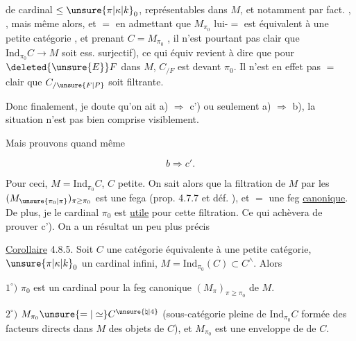 de cardinal $\leq\unsure{\pi|\kappa|k}_0$, représentables dans $M$, et notamment par fact. , , mais même alors, et $=$ en admettant que $M_{\pi_0}$ lui-$=$\unsure{!} est équivalent à une petite catégorie\deleted{\unsure{)}} , et prenant $C=M_{\pi_0}$\deleted{\unsure{)}} , il n'est pourtant pas clair que   $\mathrm{Ind}_{\pi_0} C\longrightarrow M$ soit ess. surjectif), ce qui équiv revient à dire que pour  $\deleted{\unsure{E}}F$ dans $M$, $C_{/F}$ est  devant $\pi_0$. Il n'est en effet pas $=$ clair que $C_{/\unsure{F|P}}$ soit filtrante.

Donc finalement, je doute qu'on ait a) $\Longrightarrow$ c') ou seulement a) $\Longrightarrow$ b), la situation n'est pas bien comprise visiblement.

Mais prouvons quand même

\[ b\Longrightarrow c'. \]

Pour ceci,   $M=\mathrm{Ind}_{\pi_0}C$, $C$ petite. On sait alors que la filtration de $M$ par les $(M_{\unsure{\pi_0|\pi}})_{\pi\geq\pi_0}$ est une  fega (prop. 4.7.7 et déf. ), et $=$ une feg \uline{canonique}. De plus, je  le cardinal $\pi_0$ est \uline{utile}  pour cette filtration. Ce qui achèvera de prouver c').  On a un résultat un peu plus précis\unsure{:}

\uline{Corollaire} 4.8.5. Soit $C$ une  catégorie équivalente à une petite catégorie,  $\unsure{\pi|\kappa|k}_0$ un cardinal infini, $M=\mathrm{Ind}_{\pi_0}(C)\subset C^{\wedge}$. Alors

$1^\circ)$ $\pi_0$ est un cardinal  pour la  feg canonique $(M_\pi)_{\pi\geq\pi_0}$ de $M$.

$2^\circ)$ $M_{\pi_0}\unsure{=|\simeq}C^{\unsure{\natural|4}}$ (sous-catégorie pleine de $\mathrm{Ind}_{\pi_0}C$ formée des facteurs directs dans $M$ des objets de $C$), et $M_{\pi_0}$ est une enveloppe de  de $C$. 


